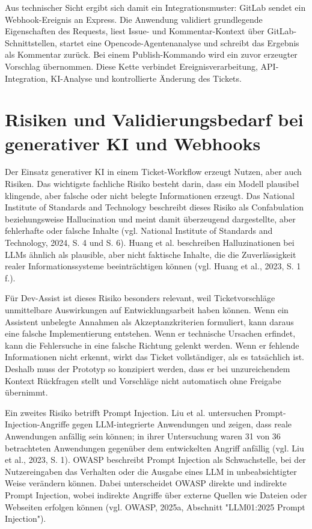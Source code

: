 \documentclass[12pt,a4paper,oneside]{scrreprt}
\begin{document}
Aus technischer Sicht ergibt sich damit ein Integrationsmuster: GitLab sendet ein Webhook-Ereignis an Express. Die Anwendung validiert grundlegende Eigenschaften des Requests, liest Issue- und Kommentar-Kontext über GitLab-Schnittstellen, startet eine Opencode-Agentenanalyse und schreibt das Ergebnis als Kommentar zurück. Bei einem Publish-Kommando wird ein zuvor erzeugter Vorschlag übernommen. Diese Kette verbindet Ereignisverarbeitung, API-Integration, KI-Analyse und kontrollierte Änderung des Tickets.

\section{Risiken und Validierungsbedarf bei generativer KI und Webhooks}

Der Einsatz generativer KI in einem Ticket-Workflow erzeugt Nutzen, aber auch Risiken. Das wichtigste fachliche Risiko besteht darin, dass ein Modell plausibel klingende, aber falsche oder nicht belegte Informationen erzeugt. Das National Institute of Standards and Technology beschreibt dieses Risiko als Confabulation beziehungsweise Hallucination und meint damit überzeugend dargestellte, aber fehlerhafte oder falsche Inhalte (vgl. National Institute of Standards and Technology, 2024, S. 4 und S. 6). Huang et al. beschreiben Halluzinationen bei LLMs ähnlich als plausible, aber nicht faktische Inhalte, die die Zuverlässigkeit realer Informationssysteme beeinträchtigen können (vgl. Huang et al., 2023, S. 1 f.).

Für Dev-Assist ist dieses Risiko besonders relevant, weil Ticketvorschläge unmittelbare Auswirkungen auf Entwicklungsarbeit haben können. Wenn ein Assistent unbelegte Annahmen als Akzeptanzkriterien formuliert, kann daraus eine falsche Implementierung entstehen. Wenn er technische Ursachen erfindet, kann die Fehlersuche in eine falsche Richtung gelenkt werden. Wenn er fehlende Informationen nicht erkennt, wirkt das Ticket vollständiger, als es tatsächlich ist. Deshalb muss der Prototyp so konzipiert werden, dass er bei unzureichendem Kontext Rückfragen stellt und Vorschläge nicht automatisch ohne Freigabe übernimmt.

Ein zweites Risiko betrifft Prompt Injection. Liu et al. untersuchen Prompt-Injection-Angriffe gegen LLM-integrierte Anwendungen und zeigen, dass reale Anwendungen anfällig sein können; in ihrer Untersuchung waren 31 von 36 betrachteten Anwendungen gegenüber dem entwickelten Angriff anfällig (vgl. Liu et al., 2023, S. 1). OWASP beschreibt Prompt Injection als Schwachstelle, bei der Nutzereingaben das Verhalten oder die Ausgabe eines LLM in unbeabsichtigter Weise verändern können. Dabei unterscheidet OWASP direkte und indirekte Prompt Injection, wobei indirekte Angriffe über externe Quellen wie Dateien oder Webseiten erfolgen können (vgl. OWASP, 2025a, Abschnitt "LLM01:2025 Prompt Injection").
\end{document}

